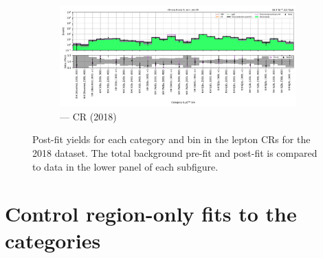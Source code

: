 \begin{figure}[htbp]
    \begin{subfigure}[b]{0.65\textwidth}
        \includegraphics[width=\textwidth]{chapters/higgstoinv/figures/mountain_ranges/2018/ttH/Zee_tree_fit_b-abs_values_ttH_cats.pdf}
        \caption{\ttH --- \doubleEleCr \gls{CR} (2018)}
    \end{subfigure}
    \caption[Post-fit yields for each \ttH category and \ptmiss bin in the lepton control regions for the 2018 dataset]{Post-fit yields for each \ttH category and \ptmiss bin in the lepton \glspl{CR} for the 2018 dataset. The total background pre-fit and post-fit is compared to data in the lower panel of each subfigure.}
    \label{fig:htoinv_mountain_range_ttH_2018_CRs}
\end{figure}

\clearpage




\section{Control region-only fits to the \texorpdfstring{\VH}{VH} categories}
\label{sec:pre_post_fit_plots_VH_CRs}

